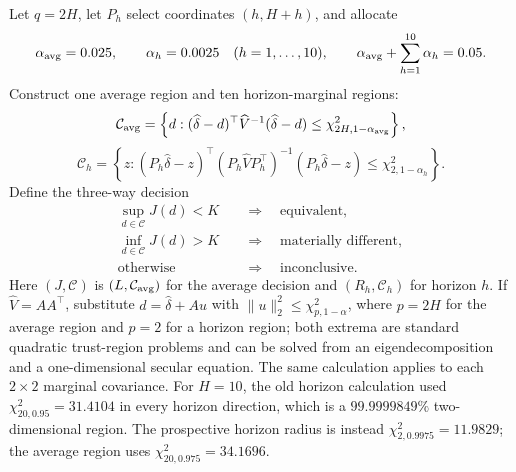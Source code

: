 Let $q=2H$, let $P_h$ select coordinates $(h,H+h)$, and allocate
\begin{equation}
  \alpha_{\rm avg}=0.025,
  \qquad \alpha_h=0.0025\quad(h=1,\ldots,10),
  \qquad \alpha_{\rm avg}+\sum_{h=1}^{10}\alpha_h=0.05.
  \label{eq:bf-ssl-lstm-region-alpha-allocation}
\end{equation}
Construct one average region and ten horizon-marginal regions:
\begin{equation}
  \mathcal C_{\rm avg}=
  \left\{d:(\widehat\delta-d)^\top\widehat V^{-1}
                 (\widehat\delta-d)
                 \leq\chi^2_{2H,1-\alpha_{\rm avg}}\right\},
  \label{eq:bf-ssl-lstm-average-wald-region}
\end{equation}
\begin{equation}
  \mathcal C_h=
  \left\{z:(P_h\widehat\delta-z)^\top
       (P_h\widehat V P_h^\top)^{-1}(P_h\widehat\delta-z)
       \leq\chi^2_{2,1-\alpha_h}\right\}.
  \label{eq:bf-ssl-lstm-horizon-wald-region}
\end{equation}
Define the three-way decision
\begin{align}
  \sup_{d\in\mathcal C}J(d)<K
    &\quad\Longrightarrow\quad \text{equivalent},                         \\
  \inf_{d\in\mathcal C}J(d)>K
    &\quad\Longrightarrow\quad \text{materially different},              \\
  \text{otherwise}
    &\quad\Longrightarrow\quad \text{inconclusive}.
  \label{eq:bf-ssl-lstm-loss-region-decision}
\end{align}
Here $(J,\mathcal C)$ is $(L,\mathcal C_{\rm avg})$ for the average decision
and $(R_h,\mathcal C_h)$ for horizon $h$.  If
$\widehat V=AA^\top$, substitute
$d=\widehat\delta+Au$ with
$\lVert u\rVert_2^2\leq\chi^2_{p,1-\alpha}$, where $p=2H$ for the average
region and $p=2$ for a horizon region; both extrema are
standard quadratic trust-region problems and can be solved from an
eigendecomposition and a one-dimensional secular equation.  The same
calculation applies to each $2\times2$ marginal covariance.  For $H=10$, the
old horizon calculation used $\chi^2_{20,0.95}=31.4104$ in every horizon
direction, which is a $99.9999849\%$ two-dimensional region.  The prospective
horizon radius is instead $\chi^2_{2,0.9975}=11.9829$; the average region uses
$\chi^2_{20,0.975}=34.1696$.

